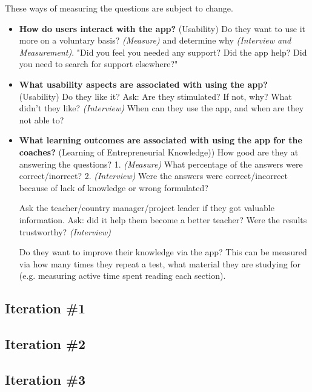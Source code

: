 These ways of measuring the questions are subject to change.


\begin{itemize}
    \item
    \textbf{How do users interact with the app?} (Usability) Do they want to use it more on a voluntary basis?
    \textit{(Measure)} and determine why \textit{(Interview and Measurement)}. "Did you feel you needed any support? Did the app help? Did you need to search for support elsewhere?"

    \item \textbf{What usability aspects are associated with using the app?} (Usability) Do they like it? Ask: Are they stimulated? If not, why? What didn't they like? \textit{(Interview)} When can they use the app, and when are they not able to?

    \item \textbf{What learning outcomes are associated with using the app for the coaches?}  (Learning of Entrepreneurial Knowledge))
    How good are they at answering the questions? 1.
    \textit{(Measure)} What percentage of the answers were correct/inorrect?  2. \textit{(Interview)} Were the answers were correct/incorrect because of lack of knowledge or wrong formulated?

    Ask the teacher/country manager/project leader if they got valuable information. Ask: did it help them become a better teacher? Were the results trustworthy? \textit{(Interview)}


    Do they want to improve their knowledge via the app? This can be measured via how many times they repeat a test, what material they are studying for (e.g. measuring active time spent reading each section).
\end{itemize}

\subsection{Iteration \#1}

\subsection{Iteration \#2}

\subsection{Iteration \#3}

